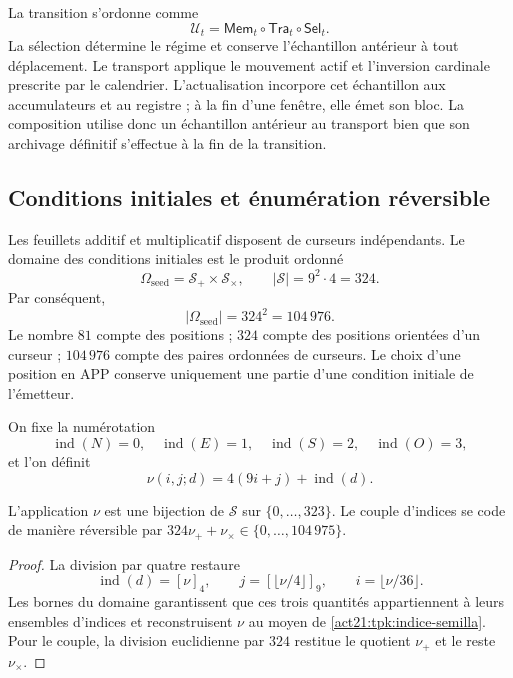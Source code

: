 La transition s'ordonne comme
\begin{equation}
 \mathcal U_t=\mathsf{Mem}_t\circ\mathsf{Tra}_t\circ\mathsf{Sel}_t.
 \label{act21:tpk:composicion}
\end{equation}
La sélection détermine le régime et conserve l'échantillon antérieur à tout déplacement. Le transport applique le mouvement actif et l'inversion cardinale prescrite par le calendrier. L'actualisation incorpore cet échantillon aux accumulateurs et au registre ; à la fin d'une fenêtre, elle émet son bloc. La composition utilise donc un échantillon antérieur au transport bien que son archivage définitif s'effectue à la fin de la transition.

\subsection{Conditions initiales et énumération réversible}
\label{act21:tpk:semillas}

Les feuillets additif et multiplicatif disposent de curseurs indépendants. Le
domaine des conditions initiales est le produit ordonné
\[
 \Omega_{\mathrm{seed}}=\mathcal S_+\times\mathcal S_\times,
 \qquad |\mathcal S|=9^2\cdot4=324.
\]
Par conséquent,
\begin{equation}
 |\Omega_{\mathrm{seed}}|=324^2=104\,976.
 \label{act21:tpk:censo-inicial}
\end{equation}
Le nombre \(81\) compte des positions ; \(324\) compte des positions orientées d'un curseur ; \(104\,976\) compte des paires ordonnées de curseurs. Le choix d'une position en APP conserve uniquement une partie d'une condition initiale de l'émetteur.

On fixe la numérotation
\[
 \operatorname{ind}(N)=0,\quad\operatorname{ind}(E)=1,\quad
 \operatorname{ind}(S)=2,\quad\operatorname{ind}(O)=3,
\]
et l'on définit
\begin{equation}
 \nu(i,j;d)=4(9i+j)+\operatorname{ind}(d).
 \label{act21:tpk:indice-semilla}
\end{equation}

\begin{proposition}
\label{act21:tpk:enumeracion}
L'application \(\nu\) est une bijection de \(\mathcal S\) sur
\(\{0,\ldots,323\}\). Le couple d'indices se code de manière réversible
par \(324\nu_++\nu_\times\in\{0,\ldots,104\,975\}\).
\end{proposition}
\begin{proof}
La division par quatre restaure
\[
 \operatorname{ind}(d)=[\nu]_4,\qquad
 j=[\lfloor\nu/4\rfloor]_9,\qquad i=\lfloor\nu/36\rfloor.
\]
Les bornes du domaine garantissent que ces trois quantités appartiennent à
leurs ensembles d'indices et reconstruisent \(\nu\) au moyen de
\eqref{act21:tpk:indice-semilla}. Pour le couple, la division euclidienne par
\(324\) restitue le quotient \(\nu_+\) et le reste \(\nu_\times\).
\end{proof}

